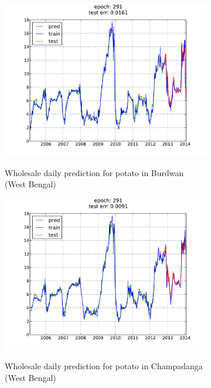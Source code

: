 \begin{figure}[H]
\begin{subfigure}[b]{.45\linewidth}
        \centering
        \includegraphics[width=\textwidth]{img/ffnn/5.pdf}
        \label{subfig:ffnn_pred_5}
        \caption{Wholesale daily prediction for potato in Burdwan (West Bengal)}
        \end{subfigure}
        \begin{subfigure}[b]{.45\linewidth}
        \centering
        \includegraphics[width=\textwidth]{img/ffnn/6.pdf}
        \label{subfig:ffnn_pred_6}
        \caption{Wholesale daily prediction for potato in Champadanga (West Bengal)}
        \end{subfigure}
        \begin{subfigure}[b]{.45\linewidth}
        \centering

\end{subfigure}
\end{figure}
